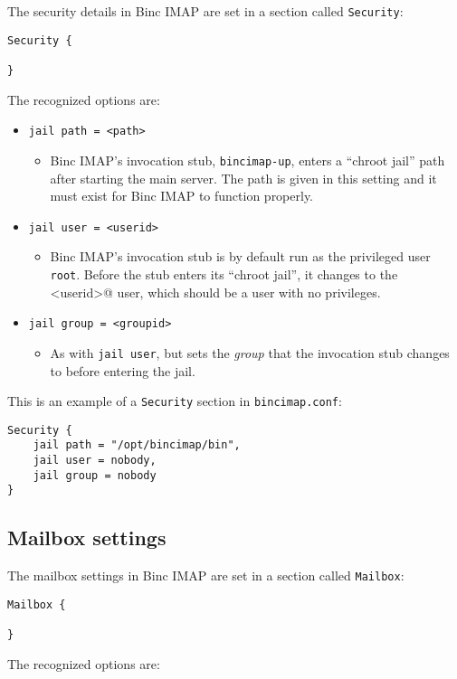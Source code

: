 \documentclass[11pt,a4paper,twoside,openright]{report}
\begin{document}
The security details in Binc IMAP are set in a section called \texttt{Security}:

\begin{Verbatim}
Security {

}
\end{Verbatim}
The recognized options are:

\begin{itemize}
\item \texttt{jail path = <path>}
  \begin{itemize}
    \item [] Binc IMAP's invocation stub, \texttt{bincimap-up}, enters
      a ``chroot jail'' path after starting the main server. The path
      is given in this setting and it must exist for Binc IMAP to
      function properly.
  \end{itemize}
\item \texttt{jail user = <userid>}
  \begin{itemize}
    \item [] Binc IMAP's invocation stub is by default run as the
      privileged user \texttt{root}. Before the stub enters its
      ``chroot jail'', it changes to the \Verb@<userid>@ user, which
      should be a user with no privileges.
  \end{itemize}
\item \texttt{jail group = <groupid>}
  \begin{itemize}
    \item [] As with \texttt{jail user}, but sets the \textit{group}
      that the invocation stub changes to before entering the jail.
  \end{itemize}
\end{itemize}
This is an example of a \texttt{Security} section in
\texttt{bincimap.conf}:

\begin{Verbatim}
Security {
    jail path = "/opt/bincimap/bin",
    jail user = nobody,
    jail group = nobody
}
\end{Verbatim}

\subsection{Mailbox settings}

The mailbox settings in Binc IMAP are set in a section called \texttt{Mailbox}:

\begin{Verbatim}
Mailbox {

}
\end{Verbatim}
The recognized options are:
\end{document}
